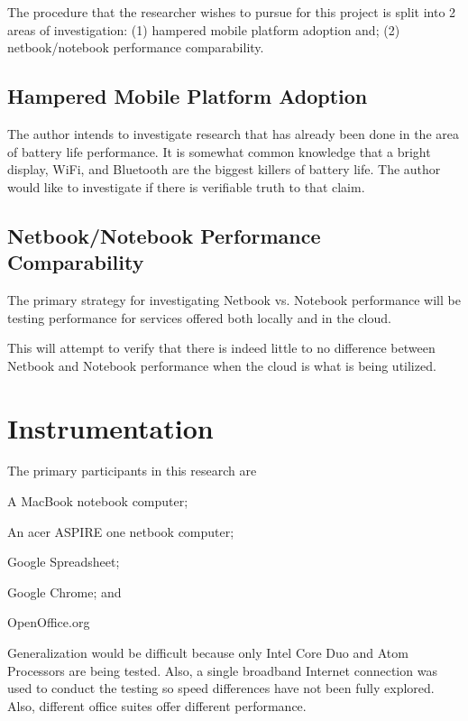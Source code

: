 \documentclass[12pt,oneside,letterpaper,titlepage]{article}
\begin{document}
The procedure that the researcher wishes to pursue for this project is split
into 2 areas of investigation: (1) hampered mobile platform adoption and; (2)
netbook/notebook performance comparability.

\subsection{Hampered Mobile Platform Adoption}

The author intends to investigate research that has already been done in the
area of battery life performance.  It is somewhat common knowledge that a bright
display, WiFi, and Bluetooth are the biggest killers of battery life.  The
author would like to investigate if there is verifiable truth to that claim.

\subsection{Netbook/Notebook Performance Comparability}

The primary strategy for investigating Netbook vs. Notebook performance will be
testing performance for services offered both locally and in the cloud.

This will attempt to verify that there is indeed little to no difference between
Netbook and Notebook performance when the cloud is what is being utilized.

\section{Instrumentation}


The primary participants in this research are 
\begin{inparaenum}[(1)]
\item A MacBook notebook computer;
\item An acer ASPIRE one netbook computer;
\item Google Spreadsheet;
\item Google Chrome; and
\item OpenOffice.org
\end{inparaenum}

Generalization would be difficult because only Intel Core Duo and Atom
Processors are being tested.  Also, a single broadband Internet connection was
used to conduct the testing so speed differences have not been fully explored.
Also, different office suites offer different performance.
\end{document}
